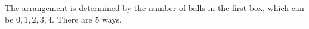 The arrangement is determined by the number of balls in the first box, which can be $0,1,2,3,4$. There are $\boxed{5}$ ways.
